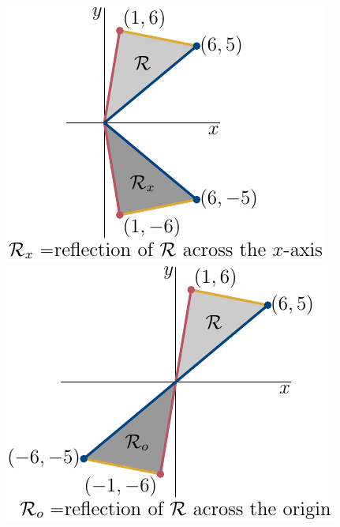 \begin{wfig}
\begin{center}
   \includegraphics[scale=1.0]{reflDx.pdf}\quad
   \includegraphics[scale=1.0]{reflDo.pdf}
\end{center}
\end{wfig}

